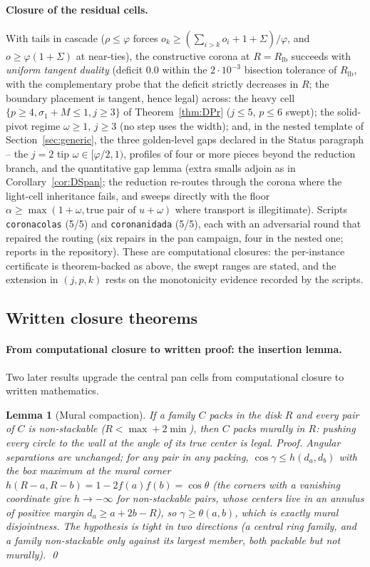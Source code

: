 \documentclass[11pt]{article}
\newtheorem{lemma}[theorem]{Lemma}
\theoremstyle{definition}
\begin{document}
\paragraph{Closure of the residual cells.} With tails in cascade
($\rho\le\varphi$ forces $o_k\ge(\sum_{i>k}o_i+1+\Sigma)/\varphi$,
and $o\ge\varphi(1+\Sigma)$ at near-ties), the constructive corona at
$R=R_{\mathrm{lb}}$ succeeds with \emph{uniform tangent duality}
(deficit $0.0$ within the $2\cdot10^{-3}$ bisection tolerance of
$R_{\mathrm{lb}}$, with the complementary probe that the deficit
strictly decreases in $R$; the boundary placement is tangent, hence
legal)
across: the heavy cell $\{p\ge4,\sigma_1+M\le1,j\ge3\}$ of
Theorem~\ref{thm:DPr} ($j\le5$, $p\le6$ swept); the
solid-pivot regime $\omega\ge1$, $j\ge3$ (no step uses the width);
and, in the nested template of Section~\ref{sec:generic}, the three
golden-level gaps declared in the Status paragraph -- the $j=2$ tip
$\omega\in[\varphi/2,1)$, profiles of four or more pieces beyond the
reduction branch, and the quantitative gap lemma (extra smalls adjoin
as in Corollary~\ref{cor:DSpan}; the reduction re-routes through the
corona where the light-cell inheritance fails, and sweeps directly
with the floor $\alpha\ge\max(1+\omega,\text{true pair of }u+\omega)$
where transport is illegitimate). Scripts \texttt{coronacolas} (5/5)
and \texttt{coronanidada} (5/5), each with an adversarial round that
repaired the routing (six repairs in the pan campaign, four in the
nested one; reports in the repository). These are computational
closures: the per-instance certificate is theorem-backed as above,
the swept ranges are stated, and the extension in $(j,p,k)$ rests on
the monotonicity evidence recorded by the scripts.

\subsection*{Written closure theorems}

\paragraph{From computational closure to written proof: the
insertion lemma.} Two later results upgrade the central pan cells
from computational closure to written mathematics.

\begin{lemma}[Mural compaction]\label{lem:compact}
If a family $C$ packs in the disk $R$ and every pair of $C$ is
non-stackable ($R<\max+2\min$), then $C$ packs murally in $R$:
pushing every circle to the wall at the angle of its true center is
legal. \emph{Proof.} Angular separations are unchanged; for any pair
in any packing, $\cos\gamma\le h(d_a,d_b)$ with the box maximum at
the mural corner $h(R-a,R-b)=1-2f(a)f(b)=\cos\theta$ (the corners
with a vanishing coordinate give $h\to-\infty$ for non-stackable
pairs, whose centers live in an annulus of positive margin
$d_a\ge a+2b-R$), so $\gamma\ge\theta(a,b)$, which is exactly mural
disjointness. The hypothesis is tight in two directions (a central
ring family, and a family non-stackable only against its largest
member, both packable but not murally). \qed
\end{lemma}
\end{document}
